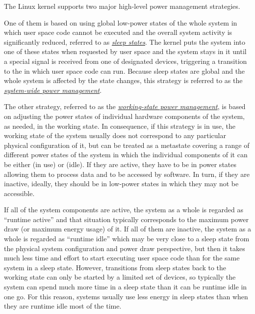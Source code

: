 \documentclass[a4paper,8pt,english]{sphinxmanual}
\begin{document}
The Linux kernel supports two major high-level power management strategies.

One of them is based on using global low-power states of the whole system in
which user space code cannot be executed and the overall system activity is
significantly reduced, referred to as {\hyperref[admin\string-guide/pm/sleep\string-states::doc]{\emph{\emph{sleep states}}}}.  The
kernel puts the system into one of these states when requested by user space
and the system stays in it until a special signal is received from one of
designated devices, triggering a transition to the  in which
user space code can run.  Because sleep states are global and the whole system
is affected by the state changes, this strategy is referred to as the
{\hyperref[admin\string-guide/pm/system\string-wide::doc]{\emph{\emph{system-wide power management}}}}.

The other strategy, referred to as the {\hyperref[admin\string-guide/pm/working\string-state::doc]{\emph{\emph{working-state power management}}}}, is based on adjusting the power states of individual hardware
components of the system, as needed, in the working state.  In consequence, if
this strategy is in use, the working state of the system usually does not
correspond to any particular physical configuration of it, but can be treated as
a metastate covering a range of different power states of the system in which
the individual components of it can be either  (in use) or
 (idle).  If they are active, they have to be in power states
allowing them to process data and to be accessed by software.  In turn, if they
are inactive, ideally, they should be in low-power states in which they may not
be accessible.

If all of the system components are active, the system as a whole is regarded as
``runtime active'' and that situation typically corresponds to the maximum power
draw (or maximum energy usage) of it.  If all of them are inactive, the system
as a whole is regarded as ``runtime idle'' which may be very close to a sleep
state from the physical system configuration and power draw perspective, but
then it takes much less time and effort to start executing user space code than
for the same system in a sleep state.  However, transitions from sleep states
back to the working state can only be started by a limited set of devices, so
typically the system can spend much more time in a sleep state than it can be
runtime idle in one go.  For this reason, systems usually use less energy in
sleep states than when they are runtime idle most of the time.
\end{document}
